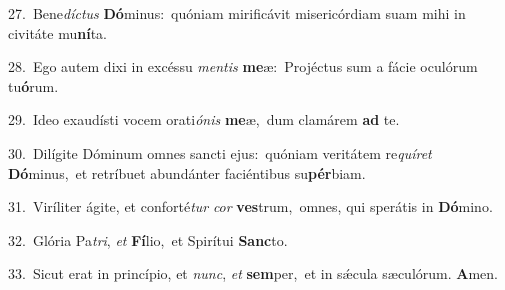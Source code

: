 {\numbfont\textcolor{\numbcolor}{27.}}~Bene\-\textit{díc}\-\textit{tus} \textbf{Dó}\-minus:~\star quóniam mirificávit misericórdiam suam mihi in civitáte mu\-\textbf{ní}\-ta.\par
{\numbfont\textcolor{\numbcolor}{28.}}~Ego autem dixi in excéssu \textit{men}\-\textit{tis} \textbf{me}\-æ:~\star Projéctus sum a fácie oculórum tu\-\textbf{ó}\-rum.\par
{\numbfont\textcolor{\numbcolor}{29.}}~Ideo exaudísti vocem orati\-\textit{ó}\-\textit{nis} \textbf{me}\-æ,~\star dum clamárem \textbf{ad} te.\par
{\numbfont\textcolor{\numbcolor}{30.}}~Dilígite Dóminum omnes sancti ejus:~\dagger quóniam veritátem re\-\textit{quí}\-\textit{ret} \textbf{Dó}\-minus,~\star et retríbuet abundánter faciéntibus su\-\textbf{pér}\-biam.\par
{\numbfont\textcolor{\numbcolor}{31.}}~Viríliter ágite, et conforté\textit{tur} \textit{cor} \textbf{ves}\-trum,~\star omnes, qui sperátis in \textbf{Dó}\-mino.\par
{\numbfont\textcolor{\numbcolor}{32.}}~Glória Pa\-\textit{tri}\-, \textit{et} \textbf{Fí}\-lio,~\star et Spirítui \textbf{Sanc}\-to.\par
{\numbfont\textcolor{\numbcolor}{33.}}~Sicut erat in princípio, et \textit{nunc}\-, \textit{et} \textbf{sem}\-per,~\star et in sǽcula sæculórum. \textbf{A}\-men.\par
